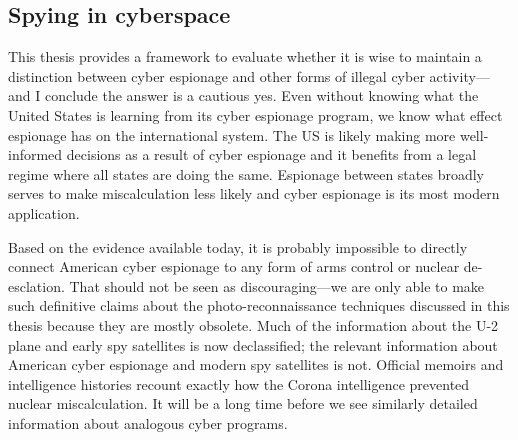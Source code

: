\documentclass{memoir}
\begin{document}

\subsection{Spying in cyberspace}
This thesis provides a framework to evaluate whether it is wise to maintain a distinction between cyber espionage and other forms of illegal cyber activity---and I conclude the answer is a cautious yes. Even without knowing what the United States is learning from its cyber espionage program, we know what effect espionage has on the international system. The US is likely making more well-informed decisions as a result of cyber espionage and it benefits from a legal regime where all states are doing the same. Espionage between states broadly serves to make miscalculation less likely and cyber espionage is its most modern application.

Based on the evidence available today, it is probably impossible to directly connect American cyber espionage to any form of arms control or nuclear de-esclation. That should not be seen as discouraging---we are only able to make such definitive claims about the photo-reconnaissance techniques discussed in this thesis because they are mostly obsolete. Much of the information about the U-2 plane and early spy satellites is now declassified; the relevant information about American cyber espionage and modern spy satellites is not. Official memoirs and intelligence histories recount exactly how the Corona intelligence prevented nuclear miscalculation. It will be a long time before we see similarly detailed information about analogous cyber programs.
\end{document}

